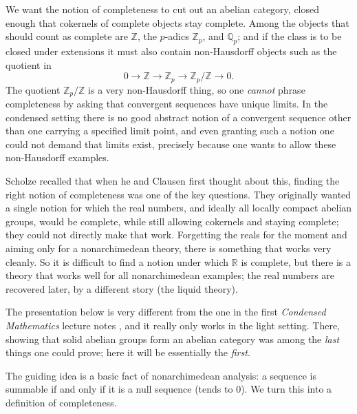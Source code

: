 We want the notion of completeness to cut out an abelian category, closed enough
that cokernels of complete objects stay complete. Among the objects that should
count as complete are $\mathbb{Z}$, the $p$-adics $\mathbb{Z}_p$, and $\mathbb{Q}_p$;
and if the class is to be closed under extensions it must also contain non-Hausdorff
objects such as the quotient in
\begin{equation*}
0\longrightarrow\mathbb{Z}\longrightarrow\mathbb{Z}_p\longrightarrow
\mathbb{Z}_p/\mathbb{Z}\longrightarrow0 .
\end{equation*}
The quotient $\mathbb{Z}_p/\mathbb{Z}$ is a very non-Hausdorff thing, so one
\emph{cannot} phrase completeness by asking that convergent sequences have unique
limits. In the condensed setting there is no good abstract notion of a convergent
sequence other than one carrying a specified limit point, and even granting such
a notion one could not demand that limits exist, precisely because one wants to
allow these non-Hausdorff examples.

\begin{remark}
\label{rmk:5:nonarchimedean-first}
Scholze recalled that when he and Clausen first thought about this, finding the
right notion of completeness was one of the key questions. They originally wanted
a single notion for which the real numbers, and ideally all locally compact
abelian groups, would be complete, while still allowing cokernels and staying
complete; they could not directly make that work. Forgetting the reals for the
moment and aiming only for a nonarchimedean theory, there is something that works
very cleanly. So it is difficult to find a notion under which $\mathbb{R}$ is
complete, but there is a theory that works well for all nonarchimedean examples;
the real numbers are recovered later, by a different story (the liquid theory).
\end{remark}

\begin{remark}
\label{rmk:5:light-presentation}
The presentation below is very different from the one in the first
\emph{Condensed Mathematics} lecture notes \cite{clausen2019condensed}, and it
really only works in the light setting. There, showing that solid abelian groups
form an abelian category was among the \emph{last} things one could prove; here it
will be essentially the \emph{first}.
\end{remark}

The guiding idea is a basic fact of nonarchimedean analysis: a sequence is
summable if and only if it is a null sequence (tends to $0$). We turn this into a
definition of completeness.

